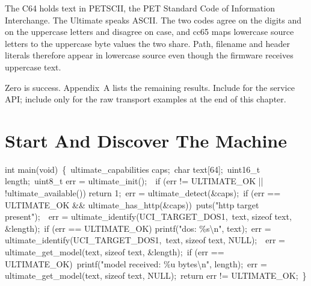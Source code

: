 The C64 holds text in PETSCII, the PET Standard Code of Information
Interchange. The Ultimate speaks ASCII. The two codes agree on the digits and
on the uppercase letters and disagree on case, and cc65 maps lowercase source
letters to the uppercase byte values the two share. Path, filename and header
literals therefore appear in lowercase source even though the firmware receives
uppercase text.

Zero is success. Appendix~A lists the remaining results. Include
 for the service API; include  only for the raw
transport examples at the end of this chapter.


\section{Start And Discover The Machine}

\begin{listingbox}
int main(void)\
\{\
\hspace*{1em}ultimate\_capabilities caps;\
\hspace*{1em}char text[64];\
\hspace*{1em}uint16\_t length;\
\hspace*{1em}uint8\_t err = ultimate\_init();\
\
\hspace*{1em}if (err != ULTIMATE\_OK || !ultimate\_available()) return 1;\
\hspace*{1em}err = ultimate\_detect(\&caps);\
\hspace*{1em}if (err == ULTIMATE\_OK \&\& ultimate\_has\_http(\&caps))\
\hspace*{2em}puts("http target present");\
\
\hspace*{1em}err = ultimate\_identify(UCI\_TARGET\_DOS1,\
\hspace*{3em}text, sizeof text, \&length);\
\hspace*{1em}if (err == ULTIMATE\_OK) printf("dos: \%s\textbackslash n", text);\
\hspace*{1em}err = ultimate\_identify(UCI\_TARGET\_DOS1,\
\hspace*{3em}text, sizeof text, NULL);\
\
\hspace*{1em}err = ultimate\_get\_model(text, sizeof text, \&length);\
\hspace*{1em}if (err == ULTIMATE\_OK)\
\hspace*{2em}printf("model received: \%u bytes\textbackslash n", length);\
\hspace*{1em}err = ultimate\_get\_model(text, sizeof text, NULL);\
\hspace*{1em}return err != ULTIMATE\_OK;\
\}
\end{listingbox}

